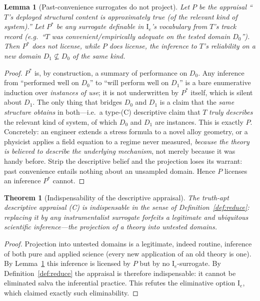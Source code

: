 \documentclass{amsart}
\theoremstyle{definition}
\theoremstyle{plain}
\newtheorem{lemma}{Lemma}
\newtheorem{theorem}{Theorem}
\begin{document}
\begin{lemma}[Past-convenience surrogates do not project]\label{lem:noproject}
Let $P$ be the appraisal ``$T$'s deployed structural content is approximately
true (of the relevant kind of system).'' Let $P^{*}$ be any surrogate definable
in $\mathrm I_e$'s vocabulary from $T$'s track record (e.g.\ ``$T$ was
convenient/empirically adequate on the tested domain $D_0$''). Then $P^{*}$ does
not license, while $P$ does license, the inference to $T$'s reliability on a
\emph{new} domain $D_1\not\subseteq D_0$ of the same kind.
\end{lemma}

\begin{proof}
$P^{*}$ is, by construction, a summary of performance on $D_0$. Any inference
from ``performed well on $D_0$'' to ``will perform well on $D_1$'' is a bare
enumerative induction over \emph{instances of use}; it is not underwritten by
$P^{*}$ itself, which is silent about $D_1$. The only thing that bridges $D_0$
and $D_1$ is a claim that the \emph{same structure obtains} in both---i.e.\ a
type-(C) descriptive claim that $T$ \emph{truly describes} the relevant kind of
system, of which $D_0$ and $D_1$ are instances. This is exactly $P$. Concretely:
an engineer extends a stress formula to a novel alloy geometry, or a physicist
applies a field equation to a regime never measured, \emph{because the theory is
believed to describe the underlying mechanism}, not merely because it was handy
before. Strip the descriptive belief and the projection loses its warrant: past
convenience entails nothing about an unsampled domain. Hence $P$ licenses an
inference $P^{*}$ cannot.
\end{proof}

\begin{theorem}[Indispensability of the descriptive appraisal]\label{thm:indispensable}
The truth-apt descriptive appraisal (C) is \emph{indispensable} in the sense of
Definition~\ref{def:reduce}: replacing it by any instrumentalist surrogate
forfeits a legitimate and ubiquitous scientific inference---the projection of a
theory into untested domains.
\end{theorem}

\begin{proof}
Projection into untested domains is a legitimate, indeed routine, inference of
both pure and applied science (every new application of an old theory is one).
By Lemma~\ref{lem:noproject} this inference is licensed by $P$ but by no
$\mathrm I_e$-surrogate. By Definition~\ref{def:reduce} the appraisal is
therefore indispensable: it cannot be eliminated salva the inferential
practice. This refutes the eliminative option $\mathrm I_e$, which claimed
exactly such eliminability.
\end{proof}
\end{document}
